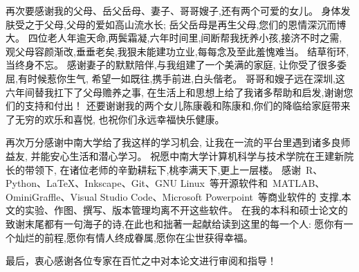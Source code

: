 再次要感谢我的父母、岳父岳母、妻子、哥哥嫂子,还有两个可爱的女儿。
身体发肤受之于父母,父母的爱如高山流水长;
岳父岳母是再生父母,您们的恩情深沉而博大。
四位老人年逾天命,两鬓霜凝,六年时间里,间断帮我抚养小孩,接济不时之需,
观父母容颜渐改,垂垂老矣,我狠未能建功立业,每每念及至此羞愧难当。
结草衔环,当终身不忘。
感谢妻子的默默陪伴,与我组建了一个美满的家庭,
让你受了很多委屈,有时候惹你生气,
希望一如既往,携手前进,白头偕老。
哥哥和嫂子远在深圳,这六年间替我扛下了父母赡养之事,
在生活上和思想上给了我诸多帮助和启发,谢谢您们的支持和付出！
还要谢谢我的两个女儿陈康羲和陈康和,你们的降临给家庭带来了无穷的欢乐和喜悦,
也祝你们永远幸福快乐健康。

再次万分感谢中南大学给了我这样的学习机会, 
让我在一流的平台里遇到诸多良师益友,
并能安心生活和潜心学习。
祝愿中南大学计算机科学与技术学院在王建新院长的带领下, 
在诸位老师的辛勤耕耘下,桃李满天下,更上一层楼。
感谢~R、Python、\LaTeX、Inkscape、Git、GNU Linux~等开源软件和~MATLAB、OminiGraffle、Visual Studio Code、Microsoft Powerpoint~等商业软件的
支撑,本文的实验、作图、撰写、版本管理均离不开这些软件。
在我的本科和硕士论文的致谢末尾都有一句海子的诗,在此也和拙著一起献给读到这里的每一个人:
愿你有一个灿烂的前程,愿你有情人终成眷属,愿你在尘世获得幸福。

最后，衷心感谢各位专家在百忙之中对本论文进行审阅和指导！
